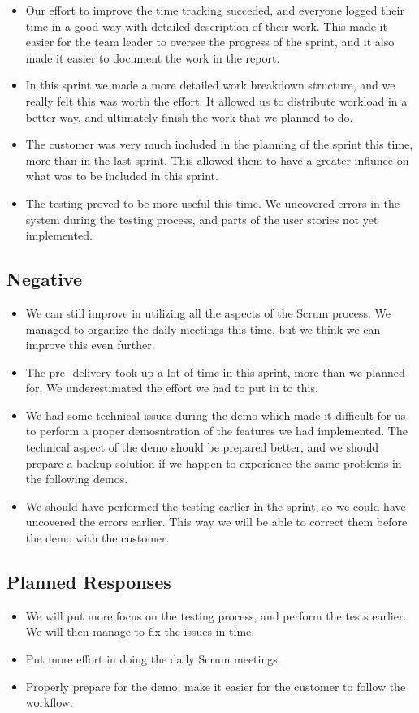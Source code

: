 \begin{itemize}
\item Our effort to improve the time tracking succeded, and everyone logged their time in a good way with detailed description of their work. This made it easier for the team leader to oversee the progress of the sprint, and it also made it easier to document the work in the report.
\item In this sprint we made a more detailed work breakdown structure, and we really felt this was worth the effort. It allowed us to distribute workload in a better way, and ultimately finish the work that we planned to do.
\item The customer was very much included in the planning of the sprint this time, more than in the last sprint. This allowed them to have a greater influnce on what was to be included in this sprint.
\item The testing proved to be more useful this time. We uncovered errors in the system during the testing process, and parts of the user stories not yet implemented.
\end{itemize}

\subsection{Negative}

\begin{itemize}
\item We can still improve in utilizing all the aspects of the Scrum process. We managed to organize the daily meetings this time, but we think we can improve this even further.
\item The pre- delivery took up a lot of time in this sprint, more than we planned for. We underestimated the effort we had to put in to this.
\item We had some technical issues during the demo which made it difficult for us to perform a proper demosntration of the features we had implemented. The technical aspect of the demo should be prepared better, and we should prepare a backup solution if we happen to experience the same problems in the following demos.
\item We should have performed the testing earlier in the sprint, so we could have uncovered the errors earlier. This way we will be able to correct them before the demo with the customer.
\end{itemize}

\subsection{Planned Responses}
\begin{itemize}
\item We will put more focus on the testing process, and perform the tests earlier. We will then manage to fix the issues in time.
\item Put more effort in doing the daily Scrum meetings.
\item Properly prepare for the demo, make it easier for the customer to follow the workflow.
\end{itemize}

